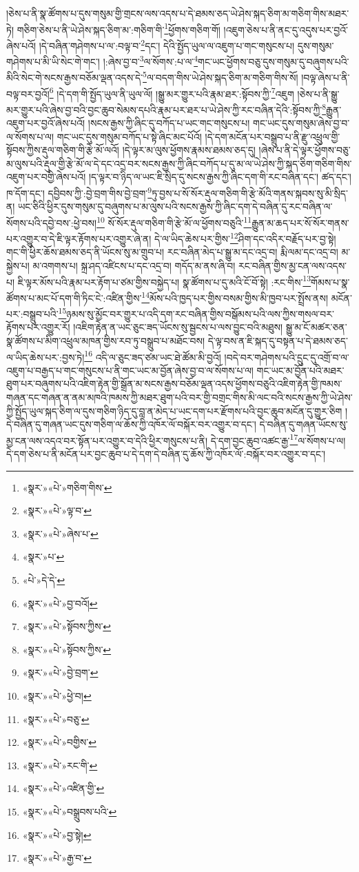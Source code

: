 །ཅེས་པ་ནི་སྣ་ཚོགས་པ་དུས་གསུམ་གྱི་གྲངས་ལས་འདས་པ་དེ་ཐམས་ཅད་ཡེ་ཤེས་སྐད་ཅིག་མ་གཅིག་གིས་མཐར་ཏེ། གཅིག་ཅེས་པ་ནི་ཡེ་ཤེས་སྐད་ཅིག་མ་:གཅིག་གི་\footnote{«སྣར་»«པེ་»གཅིག་གིས་}ཕྱོགས་གཅིག་གོ། །འཇུག་ཅེས་པ་ནི་ནང་དུ་འདུས་པར་བྱའོ་ཞེས་པའོ། །དེ་བཞིན་གཤེགས་པ་ལ་:བལྟ་བ་\footnote{«སྣར་»«པེ་»ལྟ་བ་}དང་། དེའི་སྤྱོད་ཡུལ་ལ་འཇུག་པ་གང་གསུངས་པ། དུས་གསུམ་གཤེགས་པ་མི་ཡི་སེང་གེ་གང་། །:ཞེས་བྱ་བ་\footnote{«སྣར་»«པེ་»ཞེས་པ་}ལ་སོགས་:པ་ལ་\footnote{«སྣར་»པ་}གང་ཡང་ཕྱོགས་བཅུ་དུས་གསུམ་དུ་བཞུགས་པའི་མིའི་སེང་གེ་སངས་རྒྱས་བཅོམ་ལྡན་འདས་དེ་\footnote{«པེ་»དེ་དེ་}ལ་བདག་གིས་ཡེ་ཤེས་སྐད་ཅིག་མ་གཅིག་གིས་སོ། །བལྟ་ཞེས་པ་ནི་བལྟ་བར་བྱའོ།\footnote{«སྣར་»«པེ་»བྱ་བའོ།} །དེ་དག་གི་སྤྱོད་ཡུལ་ནི་ཡུལ་ལོ། །སྒྱུ་མར་གྱུར་པའི་རྣམ་ཐར་:སྟོབས་ཀྱི་\footnote{«སྣར་»«པེ་»སྟོབས་ཀྱིས་}འཇུག །ཅེས་པ་ནི་སྒྱུ་མར་གྱུར་པའི་ཞེས་བྱ་བའི་བྱང་ཆུབ་སེམས་དཔའི་རྣམ་པར་ཐར་པ་ཡེ་ཤེས་ཀྱི་རང་བཞིན་དེའི་:སྟོབས་ཀྱི་\footnote{«སྣར་»«པེ་»སྟོབས་ཀྱིས་}རྒྱུན་འཇུག་པར་བྱའོ་ཞེས་པའོ། །སངས་རྒྱས་ཀྱི་ཞིང་དུ་བཀོད་པ་ཡང་གང་གསུངས་པ། གང་ཡང་དུས་གསུམ་ཞེས་བྱ་བ་ལ་སོགས་པ་ལ། གང་ཡང་དུས་གསུམ་བཀོད་པ་སྟེ་ཞིང་མང་པོའོ། །དེ་དག་མངོན་པར་བསྒྲུབ་པ་ནི་རྫུ་འཕྲུལ་གྱི་སྟོབས་ཀྱིས་རྡུལ་གཅིག་གི་རྩེ་མོ་ལའོ། །དེ་ལྟར་མ་ལུས་ཕྱོགས་རྣམས་ཐམས་ཅད་དུ། །ཞེས་པ་ནི་དེ་ལྟར་ཕྱོགས་བཅུ་མ་ལུས་པའི་རྡུལ་གྱི་རྩེ་མོ་ལ་དེ་དང་འདྲ་བར་སངས་རྒྱས་ཀྱི་ཞིང་བཀོད་པ་དུ་མ་ལ་ཡེ་ཤེས་ཀྱི་སྐད་ཅིག་གཅིག་གིས་འཇུག་པར་བགྱི་ཞེས་པའོ། །ད་ལྟར་བ་ཉིད་ལ་ཡང་ཇི་སྲིད་དུ་སངས་རྒྱས་ཀྱི་ཞིང་དག་གི་རང་བཞིན་དང་། ཚད་དང་། ཁ་དོག་དང་། དབྱིབས་ཀྱི་:བྱེ་བྲག་གིས་བྱེ་བྲག་\footnote{«སྣར་»«པེ་»བྱེ་བྲག་}ཏུ་བྱས་པ་སོ་སོར་རྡུལ་གཅིག་གི་རྩེ་མོའི་གནས་སྐབས་སུ་མི་སྲིད་ན། ཡང་ཅིའི་ཕྱིར་དུས་གསུམ་དུ་བཞུགས་པ་མ་ལུས་པའི་སངས་རྒྱས་ཀྱི་ཞིང་དག་དེ་བཞིན་དུ་རང་བཞིན་ལ་སོགས་པའི་དབྱེ་བས་:ཕྱེ་བས།\footnote{«སྣར་»«པེ་»ཕྱེ་བ།} སོ་སོར་རྡུལ་གཅིག་གི་རྩེ་མོ་ལ་ཕྱོགས་བཅུའི་\footnote{«སྣར་»«པེ་»བཅུ་}རྒྱུན་མ་ཆད་པར་སོ་སོར་གནས་པར་འགྱུར་བ་དེ་ཇི་ལྟར་རྟོགས་པར་འགྱུར་ཞེ་ན། དེ་ལ་ཡིད་ཆེས་པར་གྱིས་\footnote{«སྣར་»«པེ་»བགྱིས་}ཤིག་དང་འདིར་བརྗོད་པར་བྱ་སྟེ། གང་གི་ཕྱིར་ཆོས་ཐམས་ཅད་ནི་ཡོངས་སུ་མ་གྲུབ་པ། རང་བཞིན་མེད་པ་སྒྱུ་མ་དང་འདྲ་བ། རྨི་ལམ་དང་འདྲ་བ། མ་སྐྱེས་པ། མ་འགགས་པ། སྐྲ་ཤད་འཛིངས་པ་དང་འདྲ་བ། གདོད་མ་ནས་ཞི་བ། རང་བཞིན་གྱིས་མྱ་ངན་ལས་འདས་པ། ཇི་ལྟར་མོས་པའི་རྣམ་པར་རྟོག་པ་ཙམ་གྱིས་བསྐྱེད་པ། སྣ་ཚོགས་པ་དུ་མའི་ངོ་བོ་སྟེ། :རང་གིས་\footnote{«སྣར་»«པེ་»རང་གི་}གོམས་པ་སྣ་ཚོགས་པ་མང་པོ་དག་གི་ཏིང་ངེ་:འཛིན་གྱིས་\footnote{«སྣར་»«པེ་»འཛིན་གྱི་}མོས་པའི་ཁྱད་པར་གྱིས་བསམ་གྱིས་མི་ཁྱབ་པར་སྤྲོས་ནས། མངོན་པར་:བསྒྲུབ་པའི་\footnote{«སྣར་»«པེ་»བསྒྲུབས་པའི་}ཉམས་སུ་མྱོང་བར་གྱུར་པ་འདི་དག་རང་བཞིན་གྱིས་བསྒོམས་པའི་ལས་ཀྱིས་གསལ་བར་རྟོགས་པར་འགྱུར་རོ། །འཇིག་རྟེན་ན་ཡང་ཅུང་ཟད་ཡོངས་སུ་སྦྱངས་པ་ལས་བྱུང་བའི་མཐུས། སྒྱུ་མ་ངོ་མཚར་ཅན་སྣ་ཚོགས་པ་མིག་འཕྲུལ་མཁན་གྱིས་རབ་ཏུ་བསྒྲུབ་པ་མཐོང་བས། དེ་ལྟ་བས་ན་ཇི་སྐད་དུ་བསྟན་པ་དེ་ཐམས་ཅད་ལ་ཡིད་ཆེས་པར་:བྱས་ཏེ།\footnote{«སྣར་»«པེ་»བྱ་སྟེ།} འདི་ལ་ཅུང་ཟད་ཙམ་ཡང་ཐེ་ཚོམ་མི་བྱའོ། །བདེ་བར་གཤེགས་པའི་དྲུང་དུ་འགྲོ་བ་ལ་འཇུག་པ་བརྒྱད་པ་གང་གསུངས་པ་ནི་གང་ཡང་མ་བྱོན་ཞེས་བྱ་བ་ལ་སོགས་པ་ལ། གང་ཡང་མ་བྱོན་པའི་མཐར་ཐུག་པར་བཞུགས་པའི་འཇིག་རྟེན་གྱི་སྒྲོན་མ་སངས་རྒྱས་བཅོམ་ལྡན་འདས་ཕྱོགས་བཅུའི་འཇིག་རྟེན་གྱི་ཁམས་གཞན་དང་གཞན་ན་ནམ་མཁའི་ཁམས་ཀྱི་མཐར་ཐུག་པའི་བར་གྱི་བགྲང་གིས་མི་ལང་བའི་སངས་རྒྱས་ཀྱི་ཡེ་ཤེས་ཀྱི་སྤྱོད་ཡུལ་སྐད་ཅིག་ལ་དུས་གཅིག་ཉིད་དུ་བླ་ན་མེད་པ་ཡང་དག་པར་རྫོགས་པའི་བྱང་ཆུབ་མངོན་དུ་གྱུར་ཅིག །དེ་བཞིན་དུ་གཞན་ཡང་དུས་གཅིག་ལ་ཆོས་ཀྱི་འཁོར་ལོ་བསྐོར་བར་འགྱུར་བ་དང་། དེ་བཞིན་དུ་གཞན་ཡོངས་སུ་མྱ་ངན་ལས་འདའ་བར་སྟོན་པར་འགྱུར་བ་དེའི་ཕྱིར་གསུངས་པ་ནི། དེ་དག་བྱང་ཆུབ་འཚང་རྒྱ་\footnote{«སྣར་»«པེ་»རྒྱ་བ་}ལ་སོགས་པ་ལ། དེ་དག་ཅེས་པ་ནི་མངོན་པར་བྱང་ཆུབ་པ་དེ་དག་དེ་བཞིན་དུ་ཆོས་ཀྱི་འཁོར་ལོ་:བསྐོར་བར་འགྱུར་བ་དང་། 
